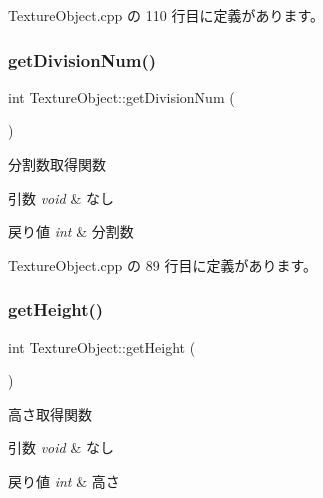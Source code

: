  Texture\+Object.\+cpp の 110 行目に定義があります。

\mbox{\label{class_texture_object_abac4508851ecec7162097729e4c04cc5}} 
\subsubsection{\texorpdfstring{get\+Division\+Num()}{getDivisionNum()}}
{\footnotesize\ttfamily int Texture\+Object\+::get\+Division\+Num (\begin{DoxyParamCaption}{ }\end{DoxyParamCaption})}



分割数取得関数 


\begin{DoxyParams}{引数}
{\em void} & なし \\
\hline
\end{DoxyParams}

\begin{DoxyRetVals}{戻り値}
{\em int} & 分割数 \\
\hline
\end{DoxyRetVals}


 Texture\+Object.\+cpp の 89 行目に定義があります。

\mbox{\label{class_texture_object_a072347536b4d036b78ee132f61538f5d}} 
\subsubsection{\texorpdfstring{get\+Height()}{getHeight()}}
{\footnotesize\ttfamily int Texture\+Object\+::get\+Height (\begin{DoxyParamCaption}{ }\end{DoxyParamCaption})}



高さ取得関数 


\begin{DoxyParams}{引数}
{\em void} & なし \\
\hline
\end{DoxyParams}

\begin{DoxyRetVals}{戻り値}
{\em int} & 高さ \\
\hline
\end{DoxyRetVals}


